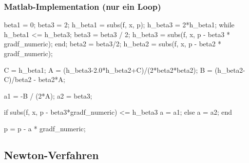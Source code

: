  \subsubsection{Matlab-Implementation (nur ein Loop)}
  \begin{MatlabCode}
    beta1 = 0;
    beta3 = 2; %
    h_beta1 = subs(f, x, p);
    h_beta3 = 2*h_beta1; %
    while h_beta1 <= h_beta3;
        beta3 = beta3 / 2;
        h_beta3 = subs(f, x, p - beta3 * gradf_numeric);
    end;
    beta2 = beta3/2;
    h_beta2 = subs(f, x, p - beta2 * gradf_numeric);

    C = h_beta1;
    A = (h_beta3-2.0*h_beta2+C)/(2*beta2*beta2);
    B = (h_beta2-C)/beta2 - beta2*A;
 
    a1 = -B / (2*A);
    a2 = beta3;
    
    if subs(f, x, p - beta3*gradf_numeric) <= h_beta3 
        a = a1;
    else
        a = a2;
    end
    
    
    p = p - a * gradf_numeric;
  \end{MatlabCode}
  
\subsection{Newton-Verfahren}

